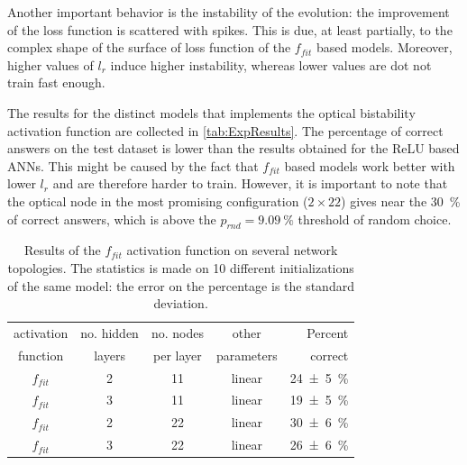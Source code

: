 Another important behavior is the instability of the evolution: the improvement of the loss function is scattered with spikes.
This is due, at least partially, to the complex shape of the surface of loss function of the $f_{fit}$ based models.
Moreover, higher values of $l_r$ induce higher instability, whereas lower values are dot not train fast enough.

The results for the distinct models that implements the optical bistability activation function are collected in \autoref{tab:ExpResults}.
The percentage of correct answers on the test dataset is lower than the results obtained for the \ac{ReLU} based \acp{ANN}.
This might be caused by the fact that $f_{fit}$ based models work better with lower $l_r$ and are therefore harder to train.
However, it is important to note that the optical node in the most promising configuration ($2\times 22$) gives near the \SI{30}{\percent} of correct answers, which is above the $p_{rnd}=\SI{9.09}{\percent}$ threshold of random choice.

\begin{table}[htbp]
	\centering
	\begin{tabular}{c c c c r}
	\toprule
	activation	& no. hidden 	& no. nodes	& other			& Percent\\
	function		& layers 			& per layer	& parameters	& correct\\
	\midrule	
	$f_{fit}$ 			& 2 & 11 & linear & \SI{24 +- 5}{\percent} \\
	$f_{fit}$ 			& 3 & 11 & linear & \SI{19 +- 5}{\percent} \\
	$f_{fit}$ 			& 2 & 22 & linear & \SI{30 +- 6}{\percent} \\
	$f_{fit}$ 			& 3 & 22 & linear & \SI{26 +- 6}{\percent} \\
	\bottomrule
	\end{tabular}
	\caption{
		Results of the $f_{fit}$ activation function on several network topologies.
		The statistics is made on 10 different initializations of the same model:
		the error on the percentage is the standard deviation.	
	}
	\label{tab:ExpResults}
\end{table}
